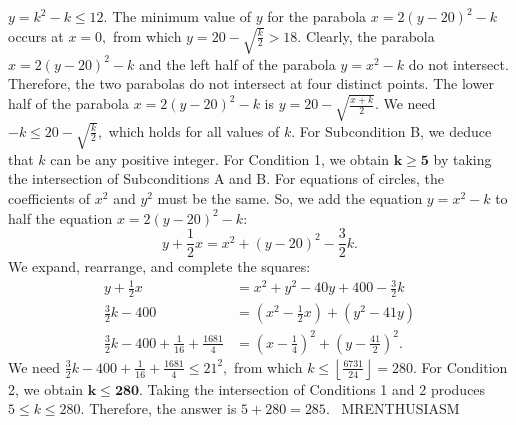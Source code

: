 \documentclass[12pt]{article}
\begin{document}
$y=k^2-k\leq12.$ The minimum value of $y$ for the parabola $x=2(y-20)^2-k$ occurs at $x=0,$ from which $y=20-\sqrt{\frac k2}>18.$ Clearly, the parabola $x=2(y-20)^2-k$ and the left half of the parabola $y=x^2-k$ do not intersect. Therefore, the two parabolas do not intersect at four distinct points. The lower half of the parabola $x=2(y-20)^2-k$ is $y=20-\sqrt{\frac{x+k}{2}}.$ We need $-k\leq20-\sqrt{\frac k2},$ which holds for all values of $k.$ For Subcondition B, we deduce that $k$ can be any positive integer. For Condition 1, we obtain $\boldsymbol{k\geq5}$ by taking the intersection of Subconditions A and B. For equations of circles, the coefficients of $x^2$ and $y^2$ must be the same. So, we add the equation $y=x^2-k$ to half the equation $x=2(y-20)^2-k:$ \[y+\frac12x=x^2+(y-20)^2-\frac32k.\] We expand, rearrange, and complete the squares: \begin{align*} y+\frac12x&=x^2+y^2-40y+400-\frac32k \\ \frac32k-400&=\left(x^2-\frac12x\right)+\left(y^2-41y\right) \\ \frac32k-400+\frac{1}{16}+\frac{1681}{4}&=\left(x-\frac14\right)^2+\left(y-\frac{41}{2}\right)^2. \end{align*} We need $\frac32k-400+\frac{1}{16}+\frac{1681}{4}\leq21^2,$ from which $k\leq\left\lfloor\frac{6731}{24}\right\rfloor=280.$ For Condition 2, we obtain $\boldsymbol{k\leq280.}$ Taking the intersection of Conditions 1 and 2 produces $5\leq k\leq280.$ Therefore, the answer is $5+280=\boxed{285}.$ ~MRENTHUSIASM
\end{document}
